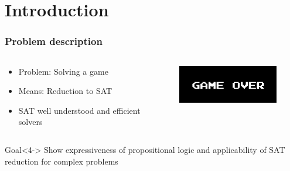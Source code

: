 \section{Introduction}

\begin{frame}
	\frametitle{Problem description}
	\begin{columns}
		\begin{column}{5cm}
			\begin{itemize}
				\item<1-> Problem: Solving a game
				\item<2-> Means: Reduction to SAT
				\item<3-> SAT well understood and efficient solvers
			\end{itemize}
			
		\end{column}
		\begin{column}{6cm}
			\begin{figure}
				\centering
				\includegraphics[width=5.5cm]{images/gameover.png}
			\end{figure}
		\end{column}
	\end{columns}
	\begin{block}{Goal}<4->
				Show expressiveness of propositional logic and applicability of SAT reduction for complex problems
	\end{block}
	
\end{frame}


